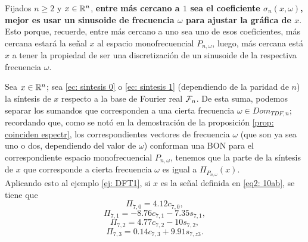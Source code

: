 \begin{nota}
\label{nota: la mejor frecuencia}
Fijados $n \geq 2$
y $x \in \mathbb{R}^{n}$, \textbf{entre más cercano a $1$ sea 
el coeficiente 
$\sigma_{n}(x, \omega)$, mejor es usar un sinusoide
de frecuencia $\omega$ para ajustar la gráfica de $x$}.
Esto porque, recuerde, entre más cercano a uno sea uno de
esos coeficientes, más cercana estará la señal $x$ 
al espacio monofrecuencial $P_{n, \omega}$, luego, más
cercana está $x$
a tener
la propiedad de ser una discretización de un sinusoide
de la respectiva frecuencia $\omega$.
\end{nota}

\begin{nota}
\label{nota: proyeciones monof TDF}
Sea $x \in \mathbb{R}^{n}$; sea 
\eqref{ec: sintesis 0} o 
\eqref{ec: sintesis 1}
(dependiendo de la paridad de $n$)
la síntesis de $x$ respecto a la base de Fourier
real $\mathcal{F}_{n}$. De esta suma, podemos
separar los sumandos que corresponden a una
cierta frecuencia $\omega \in Dom_{TDF, n}$; recordando
que, como se notó
en la demostración de la proposición
\ref{prop: coinciden espectr}, 
los correspondientes vectores
de frecuencia $\omega$ (que son ya sea uno o dos, dependiendo del valor
de $\omega$) conforman una BON para el correspondiente
espacio monofrecuencial 
$P_{n, \omega}$, tenemos que la parte de la 
síntesis de $x$ que corresponde a 
cierta frecuencia $\omega$ es igual a
$\Pi_{P_{n, \omega}}(x)$. \\

Aplicando esto al ejemplo \ref{ej: DFT1},
si $x$ es la señal definida en 
\ref{eq2: 10ab}, se tiene que
\[
\Pi_{7, 0} = 4.12 c_{7,0}, 
\]
\[
\Pi_{7, 1} = -8.76 c_{7,1} - 7.35 s_{7,1}, 
\]
\[
\Pi_{7, 2} = 4.77 c_{7,2} - 10 s_{7,2}, 
\]
\[
\Pi_{7, 3} = 0.14 c_{7,3} + 9.91 s_{7,z3}.
\]
\end{nota}



